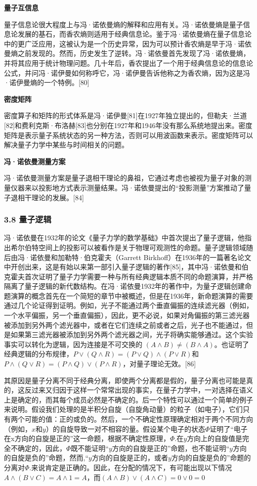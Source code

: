 \textbf{量子互信息}

量子信息论很大程度上与冯·诺依曼熵的解释和应用有关。冯·诺依曼熵是量子信息论发展的基石，而香农熵则适用于经典信息论。鉴于冯·诺依曼熵在量子信息论中的更广泛应用，这被认为是一个历史异常，因为可以预计香农熵是早于冯·诺依曼熵之前发现的。然而，历史发生了逆转。冯·诺依曼首先发现了冯·诺依曼熵，并将其应用于统计物理问题。几十年后，香农提出了一个用于经典信息论的信息论公式，并问冯·诺伊曼如何称呼它，冯·诺伊曼告诉他称之为香农熵，因为这是冯·诺伊曼熵的一个特例。[80]

\textbf{密度矩阵}

密度算子和矩阵的形式体系是冯·诺伊曼[81]在1927年独立提出的，但勒夫·兰道[82]和费利克斯·布洛赫[83]也分别在1927年和1946年没有那么系统地提出来。密度矩阵是表示量子系统状态的另一种方法，否则可以用波函数来表示。密度矩阵可以解决量子力学中某些与时间相关的问题。

\textbf{冯·诺依曼测量方案}

冯·诺依曼测量方案是量子退相干理论的鼻祖，它通过考虑也被视为量子对象的测量仪器来以投影地方式表示测量结果。冯·诺依曼提出的“投影测量”方案推动了量子退相干理论的发展。[84]
\subsubsection{3.8 量子逻辑}
冯·诺依曼在1932年的论文《量子力学的数学基础》中首次提出了量子逻辑，他指出希尔伯特空间上的投影可以被看作是关于物理可观测性的命题。量子逻辑领域随后由冯·诺依曼和加勒特·伯克霍夫（Garrett Birkhoff）在1936年的一篇著名论文中开创出来，这是有始以来第一部引入量子逻辑的著作[85]，其中冯·诺依曼和伯克霍夫首次证明了量子力学需要一种与所有经典逻辑本质不同的命题演算，并严格隔离了量子逻辑的新代数结构。在冯·诺依曼1932年的著作中，为量子逻辑创建命题演算的概念首先在一个简短的章节中被概述，但是在1936年，新命题演算的需要通过几个论证得到证明。例如，光子不能通过两个垂直偏振的连续滤光器（例如，一个水平偏振，另一个垂直偏振），因此，更不必说，如果对角偏振的第三滤光器被添加到另外两个滤光器中，或者在它们连续之前或者之后，光子也不能通过，但是如果第三滤光器被添加到另外两个滤光器之间，光子将确实能够通过。这个实验事实可以转化为逻辑，因为连接是不可交换的 $(A\land B)\ne(B\land A)$。也证明了经典逻辑的分布规律，$P\lor (Q\land R)=(P \lor Q)\land(P \lor R)$和 $P\land  (Q\lor R)=(P \land Q)\lor (P \land R)$，对量子理论无效。[86]

其原因是量子分离不同于经典分离，即使两个分离都是假的，量子分离也可能是真的，这反过来又归因于这样一个常常出现的事实，在量子力学中，一对选择在语义上是确定的，而其每个成员必然是不确定的。后一个特性可以通过一个简单的例子来说明。假设我们处理的是半积分自旋（自旋角动量）的粒子（如电子），它们只有两个可能的值：正的或负的。然后，一个不确定性原理确定相对于两个不同方向（例如，$x$和$y$）的自旋导致一对不相容的量。假设某个电子的状态$\Phi$证明了“电子在x方向的自旋是正的”这一命题，根据不确定性原理，$\Phi$.在$y$方向上的自旋值是完全不确定的，因此，$\Phi$既不能证明“$y$方向的自旋是正的”命题，也不能证明“$y$方向的自旋是负的”命题，然而,“$y$方向的自旋是正的，或者$y$方向的自旋是负的”命题的分离对$\Phi$.来说肯定是正确的。因此，在分配的情况下，有可能出现以下情况$A\land (B \lor C)=A \land 1=A$，而$(A \land B)\lor (A \land C)=0 \lor 0=0$

